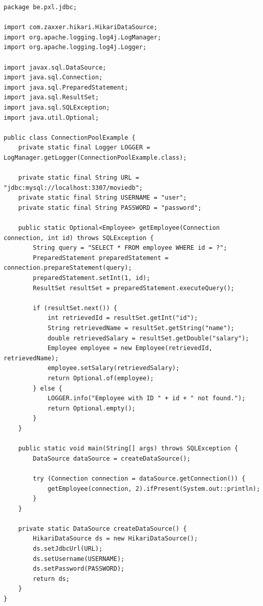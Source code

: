 \begin{lstlisting}
package be.pxl.jdbc;

import com.zaxxer.hikari.HikariDataSource;
import org.apache.logging.log4j.LogManager;
import org.apache.logging.log4j.Logger;

import javax.sql.DataSource;
import java.sql.Connection;
import java.sql.PreparedStatement;
import java.sql.ResultSet;
import java.sql.SQLException;
import java.util.Optional;

public class ConnectionPoolExample {
    private static final Logger LOGGER = LogManager.getLogger(ConnectionPoolExample.class);

    private static final String URL = "jdbc:mysql://localhost:3307/moviedb";
    private static final String USERNAME = "user";
    private static final String PASSWORD = "password";

    public static Optional<Employee> getEmployee(Connection connection, int id) throws SQLException {
        String query = "SELECT * FROM employee WHERE id = ?";
        PreparedStatement preparedStatement = connection.prepareStatement(query);
        preparedStatement.setInt(1, id);
        ResultSet resultSet = preparedStatement.executeQuery();

        if (resultSet.next()) {
            int retrievedId = resultSet.getInt("id");
            String retrievedName = resultSet.getString("name");
            double retrievedSalary = resultSet.getDouble("salary");
            Employee employee = new Employee(retrievedId, retrievedName);
            employee.setSalary(retrievedSalary);
            return Optional.of(employee);
        } else {
            LOGGER.info("Employee with ID " + id + " not found.");
            return Optional.empty();
        }
    }

    public static void main(String[] args) throws SQLException {
        DataSource dataSource = createDataSource();

        try (Connection connection = dataSource.getConnection()) {
            getEmployee(connection, 2).ifPresent(System.out::println);
        }
    }

    private static DataSource createDataSource() {
        HikariDataSource ds = new HikariDataSource();
        ds.setJdbcUrl(URL);
        ds.setUsername(USERNAME);
        ds.setPassword(PASSWORD);
        return ds;
    }
}
\end{lstlisting}


